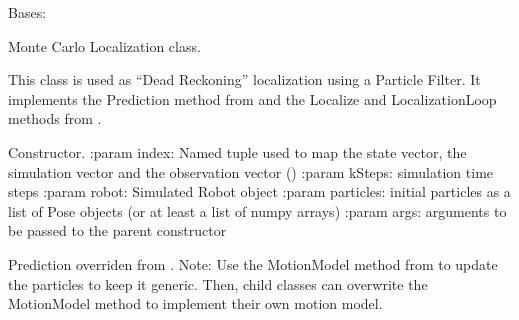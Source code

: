 \documentclass[letterpaper,10pt,english]{sphinxmanual}
\begin{document}
\begin{fulllineitems}
\label{\detokenize{particle_filter:MCLocalization.MCLocalization}}
\sphinxAtStartPar
Bases: {\hyperref[\detokenize{particle_filter:ParticleFilter.ParticleFilter}]{}}

\sphinxAtStartPar
Monte Carlo Localization class.

\sphinxAtStartPar
This class is used as “Dead Reckoning” localization using a Particle Filter.
It implements the Prediction method from  and the 
Localize and LocalizationLoop methods from .

\begin{fulllineitems}
\label{\detokenize{particle_filter:MCLocalization.MCLocalization.__init__}}
\sphinxAtStartPar
Constructor.
:param index: Named tuple used to map the state vector, the simulation vector and the observation vector ()
:param kSteps: simulation time steps
:param robot: Simulated Robot object
:param particles: initial particles as a list of Pose objects (or at least a list of numpy arrays)
:param args: arguments to be passed to the parent constructor

\end{fulllineitems}


\begin{fulllineitems}
\label{\detokenize{particle_filter:MCLocalization.MCLocalization.Prediction}}
\sphinxAtStartPar
Prediction overriden from .
Note: Use the MotionModel method from  to update the particles to keep it generic. Then,
child classes can overwrite the MotionModel method to implement their own motion model.


\end{fulllineitems}
\end{fulllineitems}
\end{document}

